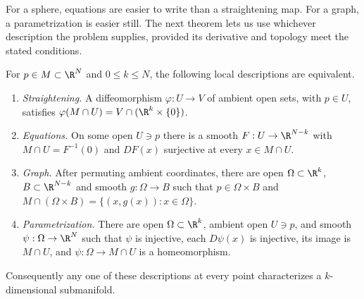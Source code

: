For a sphere, equations are easier to write than a straightening map. For a graph, a parametrization is easier still. The next theorem lets us use whichever description the problem supplies, provided its derivative and topology meet the stated conditions.

\begin{theorem}\label{thm:fourdesc}
For $p\in M\subset\R^N$ and $0\le k\le N$, the following local descriptions are equivalent.
\begin{enumerate}[label=(\alph*)]
\item \emph{Straightening.} A diffeomorphism $\varphi:U\to V$ of ambient open sets, with $p\in U$, satisfies $\varphi(M\cap U)=V\cap(\R^k\times\{0\})$.
\item \emph{Equations.} On some open $U\ni p$ there is a smooth $F:U\to\R^{N-k}$ with $M\cap U=F^{-1}(0)$ and $DF(x)$ surjective at every $x\in M\cap U$.
\item \emph{Graph.} After permuting ambient coordinates, there are open $\Omega\subset\R^k$, $B\subset\R^{N-k}$ and smooth $g:\Omega\to B$ such that $p\in\Omega\times B$ and $M\cap(\Omega\times B)=\{(x,g(x)):x\in\Omega\}$.
\item \emph{Parametrization.} There are open $\Omega\subset\R^k$, ambient open $U\ni p$, and smooth $\psi:\Omega\to\R^N$ such that $\psi$ is injective, each $D\psi(x)$ is injective, its image is $M\cap U$, and $\psi:\Omega\to M\cap U$ is a homeomorphism.
\end{enumerate}
Consequently any one of these descriptions at every point characterizes a $k$-dimensional submanifold.
\end{theorem}
